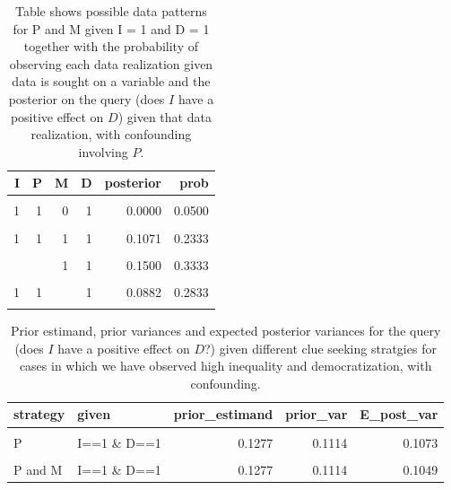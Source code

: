 \documentclass[
  12pt,
]{book}
\begin{document}
\begin{table}

\caption{\label{tab:possibleoutcomespimdconf}Table shows possible data patterns for P and M given I = 1 and D = 1 together with the probability of observing each data realization given data is sought on a variable and the posterior on the query (does $I$ have a positive effect on $D$) given that data realization, with confounding involving $P$.}
\centering
\begin{tabular}[t]{rrrrrr}
\toprule
I & P & M & D & posterior & prob\\
\midrule
\cellcolor{gray!6}{1} & \cellcolor{gray!6}{0} & \cellcolor{gray!6}{0} & \cellcolor{gray!6}{1} & \cellcolor{gray!6}{0.0000} & \cellcolor{gray!6}{0.0083}\\
1 & 1 & 0 & 1 & 0.0000 & 0.0500\\
\cellcolor{gray!6}{1} & \cellcolor{gray!6}{0} & \cellcolor{gray!6}{1} & \cellcolor{gray!6}{1} & \cellcolor{gray!6}{0.2500} & \cellcolor{gray!6}{0.1000}\\
1 & 1 & 1 & 1 & 0.1071 & 0.2333\\
\cellcolor{gray!6}{1} & \cellcolor{gray!6}{} & \cellcolor{gray!6}{0} & \cellcolor{gray!6}{1} & \cellcolor{gray!6}{0.0000} & \cellcolor{gray!6}{0.0583}\\
\addlinespace
1 &  & 1 & 1 & 0.1500 & 0.3333\\
\cellcolor{gray!6}{1} & \cellcolor{gray!6}{0} & \cellcolor{gray!6}{} & \cellcolor{gray!6}{1} & \cellcolor{gray!6}{0.2308} & \cellcolor{gray!6}{0.1083}\\
1 & 1 &  & 1 & 0.0882 & 0.2833\\
\cellcolor{gray!6}{1} & \cellcolor{gray!6}{} & \cellcolor{gray!6}{} & \cellcolor{gray!6}{1} & \cellcolor{gray!6}{0.1277} & \cellcolor{gray!6}{0.3917}\\
\bottomrule
\end{tabular}
\end{table}

\begin{table}

\caption{\label{tab:pimdlearni1d1con}Prior estimand, prior variances and expected posterior variances for the query (does $I$ have a positive effect on $D$?) given different  clue seeking  stratgies for cases in which we have observed high inequality and democratization, with confounding.}
\centering
\begin{tabular}[t]{llrrr}
\toprule
strategy & given & prior\_estimand & prior\_var & E\_post\_var\\
\midrule
\cellcolor{gray!6}{None} & \cellcolor{gray!6}{I==1 \& D==1} & \cellcolor{gray!6}{0.1277} & \cellcolor{gray!6}{0.1114} & \cellcolor{gray!6}{0.1114}\\
P & I==1 \& D==1 & 0.1277 & 0.1114 & 0.1073\\
\cellcolor{gray!6}{M} & \cellcolor{gray!6}{I==1 \& D==1} & \cellcolor{gray!6}{0.1277} & \cellcolor{gray!6}{0.1114} & \cellcolor{gray!6}{0.1085}\\
P and M & I==1 \& D==1 & 0.1277 & 0.1114 & 0.1049\\
\bottomrule
\end{tabular}
\end{table}
\end{document}
